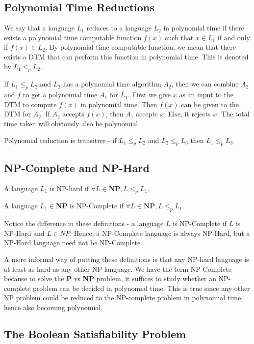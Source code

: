 \documentclass[12pt,letterpaper]{article}
\theoremstyle{definition}
\begin{document}
\subsection{Polynomial Time Reductions}

We say that a language $L_1$ reduces to a language $L_2$ in polynomial time if there exists a polynomial time computable function $f(x)$ such that $x \in L_1$ if and only if $f(x) \in L_2$. By polynomial time computable function, we mean that there exists a DTM that can perform this function in polynomial time. This is denoted by $L_1 \leq_p L_2$.

If $L_1 \leq_p L_2$ and $L_2$ has a polynomial time algorithm $A_2$, then we can combine $A_2$ and $f$ to get a polynomial time $A_1$ for $L_1$. First we give $x$ as an input to the DTM to compute $f(x)$ in polynomial time. Then $f(x)$ can be given to the DTM for $A_2$. If $A_2$ accepts $f(x)$, then $A_1$ accepts $x$. Else, it rejects $x$. The total time taken will obviously also be polynomial.

Polynomial reduction is transitive - if $L_1 \leq_p L_2$ and $L_2 \leq_p L_3$ then $L_1 \leq_p L_3$.

\subsection{NP-Complete and NP-Hard}

A language $L_1$ is NP-hard if $\forall L \in \mathbf{NP}, L \leq_p L_1$.

A language $L_1 \in \mathbf{NP}$ is NP-Complete if $\forall L \in \mathbf{NP}, L \leq_p L_1$.

Notice the difference in these definitions - a language $L$ is NP-Complete if $L$ is NP-Hard and $L \in NP$. Hence, a NP-Complete language is always NP-Hard, but a NP-Hard language need not be NP-Complete.

A more informal way of putting these definitions is that any NP-hard language is at least as hard as any other NP language. We have the term NP-Complete because to solve the \textbf{P} vs \textbf{NP} problem, it suffices to study whether an NP-complete problem can be decided in polynomial time. This is true since any other NP problem could be reduced to the NP-complete problem in polynomial time, hence also becoming polynomial.

\subsection{The Boolean Satisfiability Problem}
\end{document}
